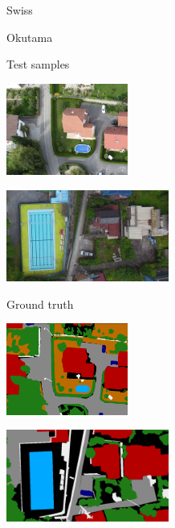 \begin{figure}[ht!]
  \centering
  \begin{subfigure}[c]{0.20\textwidth}
    \centering 
  \end{subfigure}
  \begin{subfigure}[c]{0.33\textwidth}
    \centering Swiss
  \end{subfigure}
  \begin{subfigure}[c]{0.45\textwidth}
    \centering Okutama
  \end{subfigure}
  \vspace{0.2cm}
  
  \begin{subfigure}[c]{0.20\textwidth}
    \centering Test samples
  \end{subfigure}
  \begin{subfigure}[c]{0.33\textwidth}
    \includegraphics[height=3cm]{images/part4/swi_img.png}
  \end{subfigure}
  \begin{subfigure}[c]{0.45\textwidth}
    \includegraphics[height=3cm]{images/part4/oku_img.png}
  \end{subfigure}
  \vspace{0.1cm}
  
  \begin{subfigure}[c]{0.20\textwidth}
    \centering Ground truth
  \end{subfigure}
  \begin{subfigure}[c]{0.33\textwidth}
    \includegraphics[height=3cm]{images/part4/swi_gt.png}
  \end{subfigure}
  \begin{subfigure}[c]{0.45\textwidth}
    \includegraphics[height=3cm]{images/part4/oku_gt.png}
  \end{subfigure}
  \vspace{0.1cm}
  

\end{figure}
